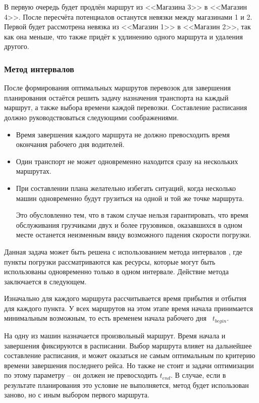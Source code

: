 	В первую очередь будет продлён маршрут из <<Магазина 3>> в <<Магазин 4>>. После пересчёта потенциалов останутся невязки между магазинами 1 и 2. Первой будет рассмотрена невязка из <<Магазин 1>> в <<Магазин 2>>, так как она меньше, что также придёт к удлинению одного маршрута и удаления другого.

	\subsubsection{Метод интервалов}
	После формирования оптимальных маршрутов перевозок для завершения планирования остаётся решить задачу назначения транспорта на каждый маршрут, а также выбора времени каждой перевозки. Составление расписания должно руководствоваться следующими соображениями.
	
	\begin{itemize}
		\item Время завершения каждого маршрута не должно превосходить время \, окончания рабочего дня водителей.
		\item Один транспорт не может одновременно находится сразу на нескольких маршрутах.
		\item При составлении плана желательно избегать ситуаций, когда несколько машин одновременно будут грузиться на одной и той же точке маршрута. 
		
		Это обусловленно тем, что в таком случае нельзя гарантировать, что время обслуживания грузчиками двух и более грузовиков, оказавшихся в одном месте останется неизменным ввиду возможного падения скорости погрузки.
	\end{itemize}
	
	Данная задача может быть решена с использованием метода интервалов \cite{schedule:intervals}, где пункты погрузки рассматриваются как ресурсы, которые могут быть использованы одновременно только в одном интервале. Действие метода заключается в следующем.
	
	Изначально для каждого маршрута рассчитывается время прибытия и отбытия для каждого пункта. У всех маршрутов на этом этапе время начала принимается минимальным возможным, то есть временем начала рабочего дня \, $t_{begin}$.
	
	На одну из машин назначается произвольный маршрут. Время начала и завершения фиксируются в расписании. Выбор маршрута влияет на дальнейшее составление расписания, и может оказаться не самым оптимальным по критерию времени завершения последнего рейса. Но также не стоит и задачи оптимизации по этому параметру -- он должен не превосходить $t_{end}$. В случае, если в результате планирования это условие не выполняется, метод будет использован заново, но с иным выбором первого маршрута.
	
